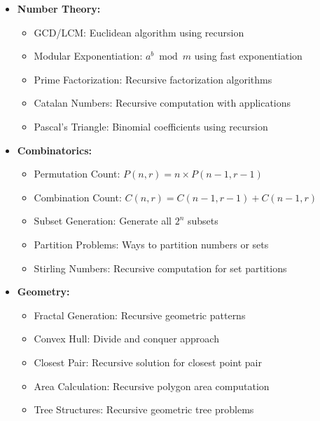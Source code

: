 \documentclass[a4paper,10pt]{book}
\begin{document}
\begin{itemize}[leftmargin=*]
    \item \textbf{Number Theory:}
    \begin{itemize}
        \item GCD/LCM: Euclidean algorithm using recursion
        \item Modular Exponentiation: $a^b \bmod m$ using fast exponentiation
        \item Prime Factorization: Recursive factorization algorithms
        \item Catalan Numbers: Recursive computation with applications
        \item Pascal's Triangle: Binomial coefficients using recursion
    \end{itemize}

    \item \textbf{Combinatorics:}
    \begin{itemize}
        \item Permutation Count: $P(n,r)=n\times P(n-1,r-1)$
        \item Combination Count: $C(n,r)=C(n-1,r-1)+C(n-1,r)$
        \item Subset Generation: Generate all $2^n$ subsets
        \item Partition Problems: Ways to partition numbers or sets
        \item Stirling Numbers: Recursive computation for set partitions
    \end{itemize}

    \item \textbf{Geometry:}
    \begin{itemize}
        \item Fractal Generation: Recursive geometric patterns
        \item Convex Hull: Divide and conquer approach
        \item Closest Pair: Recursive solution for closest point pair
        \item Area Calculation: Recursive polygon area computation
        \item Tree Structures: Recursive geometric tree problems
    \end{itemize}
\end{itemize}
\end{document}
